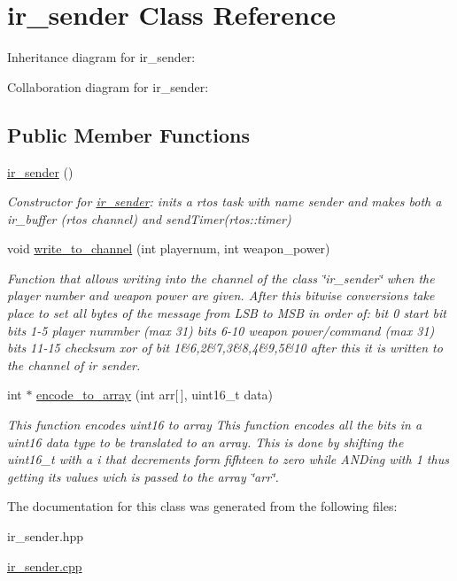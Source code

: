 \hypertarget{classir__sender}{}\section{ir\+\_\+sender Class Reference}
\label{classir__sender}


Inheritance diagram for ir\+\_\+sender\+:


Collaboration diagram for ir\+\_\+sender\+:
\subsection*{Public Member Functions}
\begin{DoxyCompactItemize}
\item 
\mbox{\label{classir__sender_a5cc4a710cdc2df0833a7994edea24ced}} 
\hyperlink{classir__sender_a5cc4a710cdc2df0833a7994edea24ced}{ir\+\_\+sender} ()
\begin{DoxyCompactList}\small\item\em Constructor for \hyperlink{classir__sender}{ir\+\_\+sender}\+: inits a rtos task with name sender and makes both a ir\+\_\+buffer (rtos channel) and send\+Timer(rtos\+::timer) \end{DoxyCompactList}\item 
\mbox{\label{classir__sender_a24ecfc6576c5cefadb02ae3397d79083}} 
void \hyperlink{classir__sender_a24ecfc6576c5cefadb02ae3397d79083}{write\+\_\+to\+\_\+channel} (int playernum, int weapon\+\_\+power)
\begin{DoxyCompactList}\small\item\em Function that allows writing into the channel of the class \char`\"{}ir\+\_\+sender\char`\"{}  when the player number and weapon power are given. After this bitwise conversions take place to set all bytes of the message from L\+SB to M\+SB in order of\+: bit 0 start bit bits 1-\/5 player nummber (max 31) bits 6-\/10 weapon power/command (max 31) bits 11-\/15 checksum xor of bit 1\&6,2\&7,3\&8,4\&9,5\&10 after this it is written to the channel of ir sender. \end{DoxyCompactList}\item 
\mbox{\label{classir__sender_a07097881bfab4bf15caf2f4b205cf692}} 
int $\ast$ \hyperlink{classir__sender_a07097881bfab4bf15caf2f4b205cf692}{encode\+\_\+to\+\_\+array} (int arr\mbox{[}$\,$\mbox{]}, uint16\+\_\+t data)
\begin{DoxyCompactList}\small\item\em This function encodes uint16 to array  This function encodes all the bits in a uint16 data type to be translated to an array. This is done by shifting the uint16\+\_\+t with a i that decrements form fifhteen to zero while A\+N\+Ding with 1 thus getting its values wich is passed to the array \char`\"{}arr\char`\"{}. \end{DoxyCompactList}\end{DoxyCompactItemize}


The documentation for this class was generated from the following files\+:\begin{DoxyCompactItemize}
\item 
ir\+\_\+sender.\+hpp\item 
\hyperlink{ir__sender_8cpp}{ir\+\_\+sender.\+cpp}\end{DoxyCompactItemize}
